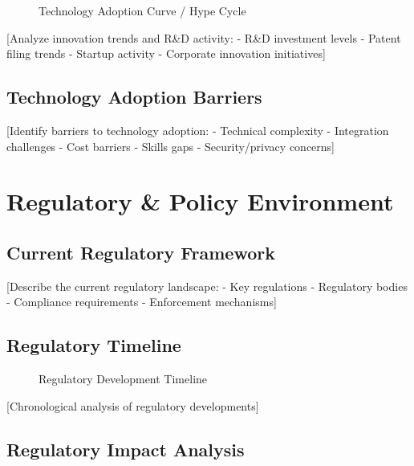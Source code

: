 \documentclass[11pt,letterpaper]{report}
\begin{document}
\begin{figure}[htbp]
\centering
\caption{Technology Adoption Curve / Hype Cycle}
\label{fig:innovation}
\end{figure}

[Analyze innovation trends and R\&D activity:
- R\&D investment levels
- Patent filing trends
- Startup activity
- Corporate innovation initiatives]

\section{Technology Adoption Barriers}

[Identify barriers to technology adoption:
- Technical complexity
- Integration challenges
- Cost barriers
- Skills gaps
- Security/privacy concerns]

\chapter{Regulatory \& Policy Environment}

\section{Current Regulatory Framework}

[Describe the current regulatory landscape:
- Key regulations
- Regulatory bodies
- Compliance requirements
- Enforcement mechanisms]

\section{Regulatory Timeline}


\begin{figure}[htbp]
\centering
\caption{Regulatory Development Timeline}
\label{fig:regulatory_timeline}
\end{figure}

[Chronological analysis of regulatory developments]

\section{Regulatory Impact Analysis}
\end{document}

